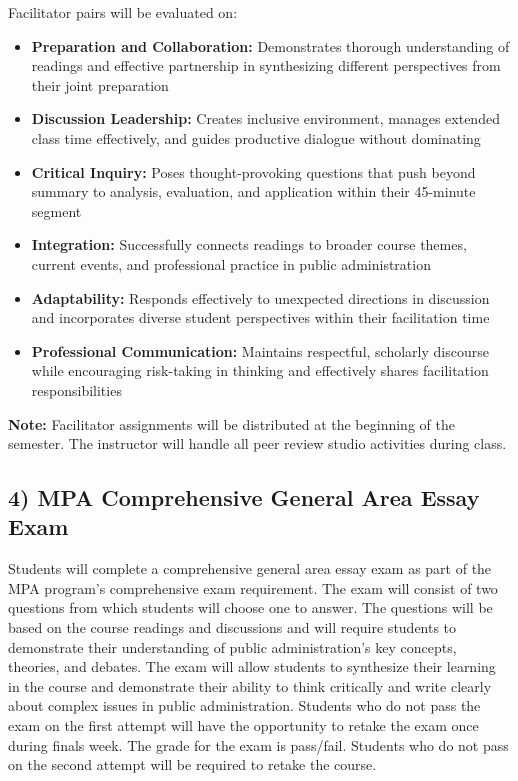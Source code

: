 \documentclass[11pt]{article}     %
\begin{document}
Facilitator pairs will be evaluated on:
\begin{itemize}
    \item \textbf{Preparation and Collaboration:} Demonstrates thorough understanding of readings and effective partnership in synthesizing different perspectives from their joint preparation
    \item \textbf{Discussion Leadership:} Creates inclusive environment, manages extended class time effectively, and guides productive dialogue without dominating
    \item \textbf{Critical Inquiry:} Poses thought-provoking questions that push beyond summary to analysis, evaluation, and application within their 45-minute segment
    \item \textbf{Integration:} Successfully connects readings to broader course themes, current events, and professional practice in public administration
    \item \textbf{Adaptability:} Responds effectively to unexpected directions in discussion and incorporates diverse student perspectives within their facilitation time
    \item \textbf{Professional Communication:} Maintains respectful, scholarly discourse while encouraging risk-taking in thinking and effectively shares facilitation responsibilities
\end{itemize}

\textbf{Note:} Facilitator assignments will be distributed at the beginning of the semester. The instructor will handle all peer review studio activities during class.

\subsection*{4) MPA Comprehensive General Area Essay Exam}

Students will complete a comprehensive general area essay exam as part of the MPA program's comprehensive exam requirement. The exam will consist of two questions from which students will choose one to answer. The questions will be based on the course readings and discussions and will require students to demonstrate their understanding of public administration's key concepts, theories, and debates. The exam will allow students to synthesize their learning in the course and demonstrate their ability to think critically and write clearly about complex issues in public administration. Students who do not pass the exam on the first attempt will have the opportunity to retake the exam once during finals week. The grade for the exam is pass/fail. Students who do not pass on the second attempt will be required to retake the course.
\end{document}
